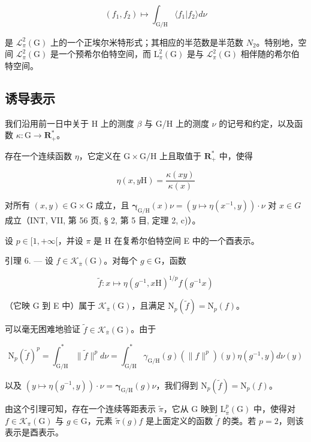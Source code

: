 \[
(f _ {1}, f _ {2}) \mapsto \int_ {\mathrm{G} / \mathrm{H}} \langle f _ {1} | f _ {2} \rangle d \nu
\]

是 \(\mathcal{L}_{\pi}^{2}(\mathrm{G})\) 上的一个正埃尔米特形式；其相应的半范数是半范数 \(N_{2}\)。特别地，空间 \(\mathcal{L}_{\pi}^{2}(\mathrm{G})\) 是一个预希尔伯特空间，而 \(\mathrm{L}_{\pi}^{2}(\mathrm{G})\) 是与 \(\mathcal{L}_{\pi}^{2}(\mathrm{G})\) 相伴随的希尔伯特空间。

\subsection{诱导表示}

我们沿用前一日中关于 H 上的测度 \(\beta\) 与 G/H 上的测度 \(\nu\) 的记号和约定，以及函数 \(\kappa\colon\mathrm{G}\to\mathbf{R}_{+}^{*}\)。

存在一个连续函数 \(\eta\)，它定义在 \(\mathrm{G} \times \mathrm{G} / \mathrm{H}\) 上且取值于 \(\mathbf{R}_{+}^{*}\) 中，使得

\[
\eta (x, y \mathrm{H}) = \frac {\kappa (x y)}{\kappa (x)}
\]

对所有 \((x,y)\in\mathrm{G}\times\mathrm{G}\) 成立，且 \(\boldsymbol{\gamma}_{\mathrm{G}/\mathrm{H}}(x)\nu=(y\mapsto\eta(x^{-1},y))\cdot\nu\) 对 \(x\in G\) 成立（INT, VII, 第 56 页, § 2, 第 5 目, 定理 2, c)）。

设 \(p \in [1, +\infty[\)，并设 \(\pi\) 是 H 在复希尔伯特空间 E 中的一个酉表示。

引理 6. --- 设 \(f \in \mathcal{K}_{\overline{\pi}}(\mathrm{G})\)。对每个 \(g \in \mathrm{G}\)，函数

\[
\widetilde {f} \colon x \mapsto \eta (g ^ {- 1}, x \mathrm{H}) ^ {1 / p} f (g ^ {- 1} x)
\]

（它映 G 到 E 中）属于 \(\mathcal{K}_{\overline{\pi}}(\mathrm{G})\)，且满足 \(\mathrm{N}_p(\widetilde{f}) = \mathrm{N}_p(f)\)。

可以毫无困难地验证 \(\tilde{f} \in \mathcal{K}_{\overline{\pi}}(\mathrm{G})\)。由于

\[
\mathrm{N} _ {p} (\widetilde {f}) ^ {p} = \int_ {\mathrm{G/H}} ^ {*} \| \widetilde {f} \| ^ {p} d \nu = \int_ {\mathrm{G/H}} ^ {*} \gamma_ {\mathrm{G/H}} (g) (\| f \| ^ {p}) (y) \eta (g ^ {- 1}, y) d \nu (y)
\]

 以及 \((y\mapsto \eta (g^{-1},y))\cdot \nu = \pmb{\gamma}_{\mathrm{G / H}}(g)\nu\)，我们得到 \(\mathrm{N}_p(\widetilde{f}) = \mathrm{N}_p(f)\)。

 由这个引理可知，存在一个连续等距表示 \(\widetilde{\pi}\)，它从 G 映到 \(\mathrm{L}_{\overline{\pi}}^{p}(\mathrm{G})\) 中，使得对 \(f\in \mathcal{K}_{\pi}(\mathrm{G})\) 与 \(g\in \mathrm{G}\)，元素 \(\widetilde{\pi}(g)f\) 是上面定义的函数 \(\widetilde{f}\) 的类。若 \(p=2\)，则该表示是酉表示。

